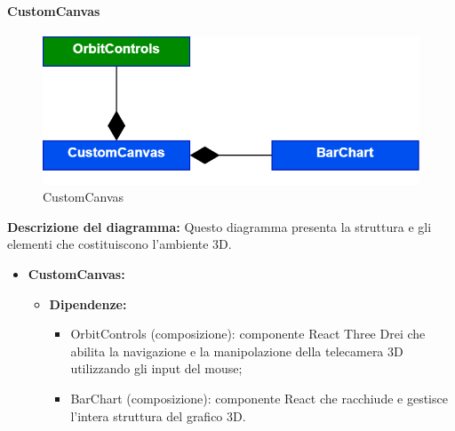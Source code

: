 \paragraph{CustomCanvas}
\begin{figure}[h!] \centering
      \includegraphics[scale=0.3]{template/images/uml_front/ui/CustomCanvas.png}
      \caption{CustomCanvas}
\end{figure}
\textbf{Descrizione del diagramma:}
Questo diagramma presenta la struttura e gli elementi che costituiscono l'ambiente 3D.
\begin{itemize}
      \item \textbf{CustomCanvas:}
            \begin{itemize}
                  \item \textbf{Dipendenze:}
                        \begin{itemize}
                              \item OrbitControls (composizione): componente React Three Drei che abilita la
                                    navigazione e la manipolazione della telecamera 3D utilizzando gli input del
                                    mouse;
                              \item BarChart (composizione): componente React che racchiude e gestisce l'intera
                                    struttura del grafico 3D.
                        \end{itemize}
            \end{itemize}
\end{itemize}

